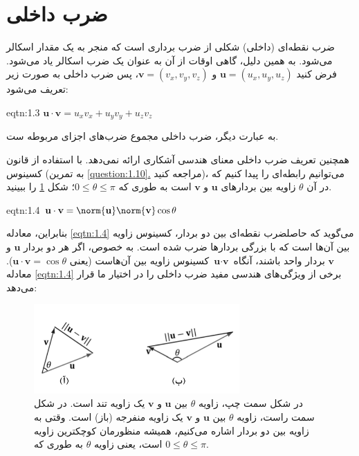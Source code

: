 \section{\textbf{ضرب داخلی}}
\label{sec:1.3}
{
    \Large
    \begin{spacing}{1.5}
        ضرب نقطه‌ای (داخلی) شکلی از ضرب برداری است که منجر به یک مقدار اسکالر می‌شود.
        به همین دلیل، گاهی اوقات از آن به عنوان یک ضرب اسکالر یاد می‌شود.
        فرض کنید $\textbf{u}=(u_{x},u_{y},u_{z})$ و  $\textbf{v}=(v_{x},v_{y},v_{z})$،
        پس ضرب داخلی به صورت زیر تعریف می‌شود:

        \begin{eqtn}{eqtn:1.3}
            \centering
            \LARGE
            $\textbf{u}\cdot\textbf{v}=u_{x}v_{x}+u_{y}v_{y}+u_{z}v_{z}$
        \end{eqtn}

        به عبارت دیگر، ضرب داخلی مجموع ضرب‌های اجزای مربوطه ست.

        همچنین تعریف ضرب داخلی معنای هندسی آشکاری ارائه نمی‌دهد.
        با استفاده از قانون کسینوس (به تمرین \hyperref[question:1.10]{\ref{question:1.10}.} مراجعه کنید)، می‌توانیم رابطه‌ای را پیدا کنیم که در آن $\theta$ زاویه بین بردارهای $\textbf{u}$ و $\textbf{v}$ است به طوری که $0\leq\theta\leq\pi$؛ شکل \ref{fig:4.Session.1.1.9} را ببینید.

        \begin{eqtn}{eqtn:1.4}
            \centering
            \LARGE
            $\textbf{u}\cdot\textbf{v}=\norm{\textbf{u}}\norm{\textbf{v}}\cos\theta$
        \end{eqtn}

        بنابراین، معادله \ref{eqtn:1.4} می‌گوید که حاصلضرب نقطه‌ای بین دو بردار، کسینوس زاویه بین آن‌ها است که با بزرگی بردارها ضرب شده است.
        به خصوص، اگر هر دو بردار $\textbf{u}$ و $\textbf{v}$ بردار واحد باشند،
        آنگاه $\textbf{u}\cdot\textbf{v}$ کسینوس زاویه بین آن‌هاست (یعنی $\textbf{u}\cdot\textbf{v}=\cos\theta$).
        معادله \ref{eqtn:1.4} برخی از ویژگی‌های هندسی مفید ضرب داخلی را در اختیار ما قرار می‌دهد:

        \begin{figure}[H]
            \centering
            \setlength{\belowcaptionskip}{-10pt}
            \includegraphics[width=0.7\textwidth]{Images/4/1/4.Session.1.1.9}
            \caption{در شکل سمت چپ، زاویه $\theta$ بین $\textbf{u}$ و $\textbf{v}$ یک زاویه تند است.
            در شکل سمت راست، زاویه $\theta$ بین $\textbf{u}$ و $\textbf{v}$ یک زاویه منفرجه (باز) است.
            وقتی به زاویه بین دو بردار اشاره می‌کنیم، همیشه منظورمان کوچکترین زاویه است،
            یعنی زاویه $\theta$ به طوری که $0\leq\theta\leq\pi$.}
            \label{fig:4.Session.1.1.9}
        \end{figure}


\end{spacing}}
